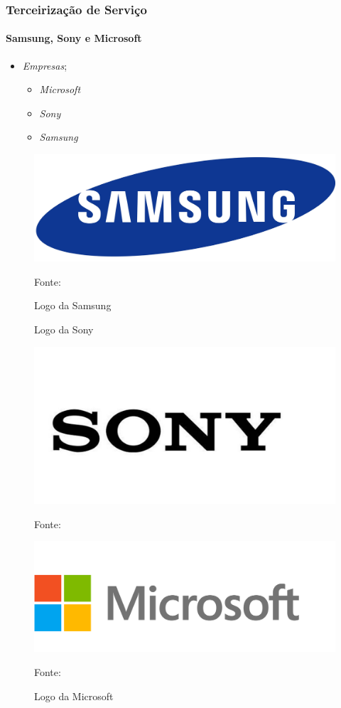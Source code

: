 \documentclass[aspectratio=169]{beamer}
\begin{document}
	\begin{frame}
		\frametitle{Terceirização de Serviço}
		\framesubtitle{Samsung, Sony e Microsoft}
		
		\begin{minipage}[!h]{.3\textwidth}
			\begin{itemize}
				\item \textit{Empresas};
				\begin{itemize}
					\item \textit{Microsoft}
					\item \textit{Sony}
					\item \textit{Samsung}
				\end{itemize}
			\end{itemize}
		\end{minipage}
		\hfill
		\begin{minipage}[!h]{.3\textwidth}
			\begin{figure}
				\centering
				\caption{Logo da Samsung}
				
				\includegraphics[width=.50\linewidth]{logo_samsung.png}
				
				\footnotesize{Fonte: }
				\label{logsam}
			\end{figure} 	 
		\end{minipage}
		\hfill	
		\begin{minipage}[!h]{.3\textwidth}
			\begin{figure}
				\centering
				\caption{Logo da Sony}
				
				\includegraphics[width=.40\linewidth]{logo_sony.png}
				
				\footnotesize{Fonte: }
				\label{logsony}
				
				\centering
				\caption{Logo da Microsoft}
				
				\includegraphics[width=.40\linewidth]{logo_microsoft.png}
				
				\footnotesize{Fonte: }
				\label{logmicro}
			\end{figure} 	
		\end{minipage}
	\end{frame}
\end{document}
